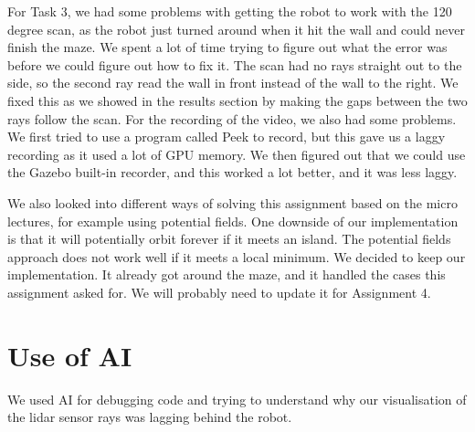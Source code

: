 \documentclass[conference]{IEEEtran}
\begin{document}
For Task 3, we had some problems with getting the robot to work with the
120 degree scan, as the robot just turned around when it hit the wall and
could never finish the maze. We spent a lot of time trying to figure
out what the error was before we could figure out how to fix it. The
scan had no rays straight out to the side, so the second ray
read the wall in front instead of the wall to the right.
We fixed this as we showed in the results section by making the gaps
between the two rays follow the scan. For the recording of the
video, we also had some problems. We first tried to use a program
called Peek to record, but this gave us a laggy recording as it used
a lot of GPU memory. We then figured out that we could use the Gazebo
built-in recorder, and this worked a lot better, and it was less laggy.

We also looked into different ways of solving this assignment
based on the micro lectures, for example using potential fields.
One downside of our implementation is that
it will potentially orbit forever if it meets an island.
The potential fields approach does not work well if it meets
a local minimum. We decided to keep our implementation. It already got around
the maze, and it handled the cases this assignment asked for.
We will probably need to update it for Assignment 4.

\section{Use of AI}
We used AI for debugging code and trying to understand why our visualisation of the lidar sensor rays was lagging behind the robot.  
\end{document}
